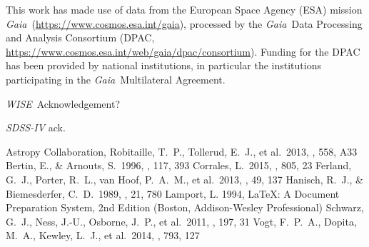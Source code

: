 \documentclass[modern]{aastex62}
\newcommand{\acronym}[1]{{\small{#1}}}
\newcommand{\project}[1]{\textsl{#1}}
\newcommand{\gaia}{\project{Gaia}}
\newcommand{\wise}{\project{\acronym{WISE}}}
\begin{document}
This work has made use of data from the European Space Agency (ESA) mission
\gaia\ (\url{https://www.cosmos.esa.int/gaia}), processed by the \gaia\ Data
Processing and Analysis Consortium (\acronym{DPAC},
\url{https://www.cosmos.esa.int/web/gaia/dpac/consortium}). Funding for the
\acronym{DPAC}
has been provided by national institutions, in particular the institutions
participating in the \gaia\ Multilateral Agreement.

\wise\ Acknowledgement?

\project{\acronym{SDSS-IV}} ack.

\begin{thebibliography}{}
 Astropy Collaboration, Robitaille, T.~P., Tollerud, E.~J., et al.\ 2013, \aap, 558, A33 
 Bertin, E., \& Arnouts, S.\ 1996, \aaps, 117, 393 
 Corrales, L.\ 2015, \apj, 805, 23
 Ferland, G.~J., Porter, R.~L., van Hoof, P.~A.~M., et al.\ 2013, \rmxaa, 49, 137
 Hanisch, R.~J., \& Biemesderfer, C.~D.\ 1989, \baas, 21, 780 
 Lamport, L. 1994, LaTeX: A Document Preparation System, 2nd Edition (Boston, Addison-Wesley Professional)
 Schwarz, G.~J., Ness, J.-U., Osborne, J.~P., et al.\ 2011, \apjs, 197, 31  
 Vogt, F.~P.~A., Dopita, M.~A., Kewley, L.~J., et al.\ 2014, \apj, 793, 127  
\end{thebibliography}


\end{document}
